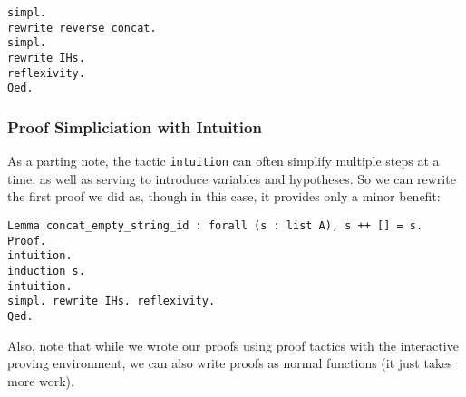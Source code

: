 \begin{verbatim}
simpl.
rewrite reverse_concat.
simpl.
rewrite IHs.
reflexivity.
Qed.
\end{verbatim}

\subsubsection{Proof Simpliciation with Intuition}

As a parting note, the tactic \texttt{intuition} can often simplify multiple steps at a time, as well as serving to introduce variables and hypotheses.
So we can rewrite the first proof we did as, though in this case, it provides only a minor benefit:
\begin{verbatim}
Lemma concat_empty_string_id : forall (s : list A), s ++ [] = s.
Proof.
intuition.
induction s.
intuition.
simpl. rewrite IHs. reflexivity.
Qed.
\end{verbatim}

Also, note that while we wrote our proofs using proof tactics with the interactive proving environment, we can also write proofs as normal functions (it just takes more work).

